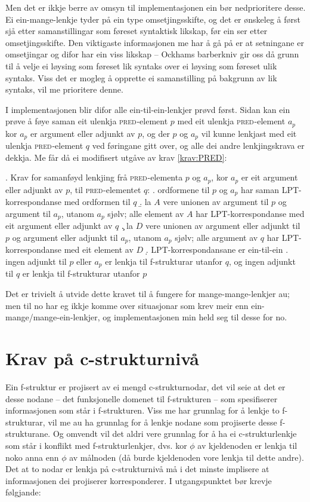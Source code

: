 \documentclass[11pt,a4paper,oneside,draft]{book}
\newcommand{\F}[2]{\textsc{#1}\ensuremath{_{#2}}}
\newcommand{\PRED}{\F{pred}{}}
\begin{document}
Men det er ikkje berre av omsyn til implementasjonen ein bør
nedprioritere desse. Ei ein-mange-lenkje tyder på ein type
omsetjingsskifte, og det er ønskeleg å først sjå etter samanstillingar
som føreset syntaktisk likskap, før ein ser etter
omsetjingsskifte. Den viktigaste informasjonen me har å gå på er at
setningane er omsetjingar og difor har ein viss likskap -- Ockhams
barberkniv gir oss då grunn til å velje ei løysing som føreset lik
syntaks over ei løysing som føreset ulik syntaks. Viss det er mogleg å
opprette ei samanstilling på bakgrunn av lik syntaks, vil me
prioritere denne.

I implementasjonen blir difor alle ein-til-ein-lenkjer prøvd
først. Sidan kan ein prøve å føye saman eit ulenkja \PRED{}-element
$p$ med eit ulenkja \PRED{}-element $a_p$ kor $a_p$ er argument eller
adjunkt av $p$, og der $p$ og $a_p$ vil kunne lenkjast med eit ulenkja
\PRED{}-element $q$ ved føringane gitt over, og alle dei andre
lenkjingskrava er dekkja. Me får då ei modifisert utgåve av krav
\ref{krav:PRED}:

\ex. \label{krav:f-ein-mange} Krav for samanføyd lenkjing frå \PRED{}-elementa
$p$ og $a_p$, kor $a_p$ er eit argument eller adjunkt av $p$, til \PRED{}-elementet $q$:
\a. ordformene til $p$ og $a_p$ har saman LPT-korrespondanse med ordformen til $q$
\b. la $A$ vere unionen av argument til $p$ og argument til $a_p$,
    utanom $a_p$ sjølv;
    alle element av $A$ har LPT-korrespondanse med eit argument eller adjunkt av $q$
\c. la $D$ vere unionen av argument eller adjunkt til $p$ og argument
    eller adjunkt til $a_p$, utanom $a_p$ sjølv;
    alle argument av $q$ har LPT-korrespondanse med eit element av $D$
\d. LPT-korrespondansane er ein-til-ein
\e. ingen adjunkt til $p$ eller $a_p$ er lenkja til f-strukturar utanfor $q$, og ingen
    adjunkt til $q$ er lenkja til f-strukturar utanfor $p$

Det er trivielt å utvide dette kravet til å fungere for
mange-mange-lenkjer au; men til no har eg ikkje komme over situasjonar
som krev meir enn ein-mange/mange-ein-lenkjer, og implementasjonen min
held seg til desse for no.

\section{Krav på c-strukturnivå}
\label{sec-3.7}

\label{SEC:subnode}

Ein f-struktur er projisert av ei mengd c-strukturnodar, det vil seie
at det er desse nodane -- det funksjonelle domenet til f-strukturen --
som spesifiserer informasjonen som står i f-strukturen. Viss me har
grunnlag for å lenkje to f-strukturar, vil me au ha grunnlag for å
lenkje nodane som projiserte desse f-strukturane. Og omvendt vil det
aldri vere grunnlag for å ha ei c-strukturlenkje som står i konflikt
med f-strukturlenkjer, dvs. kor $\phi$ av kjeldenoden er lenkja til
noko anna enn $\phi$ av målnoden (då burde kjeldenoden vore lenkja til
dette andre). Det at to nodar er lenkja på c-strukturnivå må i det
minste implisere at informasjonen dei projiserer korresponderer. I
utgangspunktet bør krevje følgjande:
\end{document}

